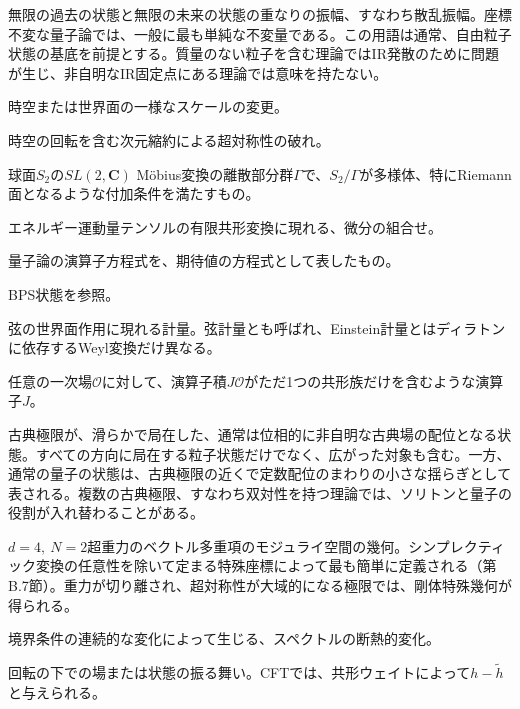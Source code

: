 {無限の過去の状態と無限の未来の状態の重なりの振幅、すなわち散乱振幅。座標不変な量子論では、一般に最も単純な不変量である。この用語は通常、自由粒子状態の基底を前提とする。質量のない粒子を含む理論ではIR発散のために問題が生じ、非自明なIR固定点にある理論では意味を持たない。}

{時空または世界面の一様なスケールの変更。}

{時空の回転を含む次元縮約による超対称性の破れ。}

{球面$S_2$の$SL(2,\mathbf C)$ Möbius変換の離散部分群$\Gamma$で、$S_2/\Gamma$が多様体、特にRiemann面となるような付加条件を満たすもの。}

{エネルギー運動量テンソルの有限共形変換に現れる、微分の組合せ。}

{量子論の演算子方程式を、期待値の方程式として表したもの。}

{BPS状態を参照。}

{弦の世界面作用に現れる計量。弦計量とも呼ばれ、Einstein計量とはディラトンに依存するWeyl変換だけ異なる。}

{任意の一次場$\mathcal O$に対して、演算子積$J\mathcal O$がただ1つの共形族だけを含むような演算子$J$。}

{古典極限が、滑らかで局在した、通常は位相的に非自明な古典場の配位となる状態。すべての方向に局在する粒子状態だけでなく、広がった対象も含む。一方、通常の量子の状態は、古典極限の近くで定数配位のまわりの小さな揺らぎとして表される。複数の古典極限、すなわち双対性を持つ理論では、ソリトンと量子の役割が入れ替わることがある。}

{$d=4,\ N=2$超重力のベクトル多重項のモジュライ空間の幾何。シンプレクティック変換の任意性を除いて定まる特殊座標によって最も簡単に定義される（第B.7節）。重力が切り離され、超対称性が大域的になる極限では、剛体特殊幾何が得られる。}

{境界条件の連続的な変化によって生じる、スペクトルの断熱的変化。}

{回転の下での場または状態の振る舞い。CFTでは、共形ウェイトによって$h-\widetilde h$と与えられる。}


